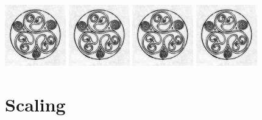 \documentclass{article}
\begin{document}
\includegraphics[angle=45,width=100px]{helvetios}
\includegraphics[angle=90,width=100px]{helvetios}
\includegraphics[angle=135,width=100px]{helvetios}
\includegraphics[angle=180,width=100px]{helvetios}

\section*{Scaling}
\end{document}
